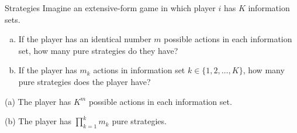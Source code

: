\documentclass[10pt]{extarticle}
\title{}
\author{Avinash Iyer}
\date{}
\begin{document}
\renewcommand{\arraystretch}{1.5}
  \begin{problem}{Strategies}
    Imagine an extensive-form game in which player $i$ has $K$ information sets.
    \begin{enumerate}[(a)]
      \item If the player has an identical number $m$ possible actions in each information set, how many pure strategies do they have?
      \item If the player has $m_k$ actions in information set $k\in \{1,2,\dots,K\}$, how many pure strategies does the player have?
    \end{enumerate}
    \tcblower
    \begin{problem}{(a)}
      The player has $K^{m}$ possible actions in each information set.
    \end{problem}
    \begin{problem}{(b)}
      The player has $\prod_{k=1}^{k}m_k$ pure strategies.
    \end{problem}
  \end{problem}
\end{document}
